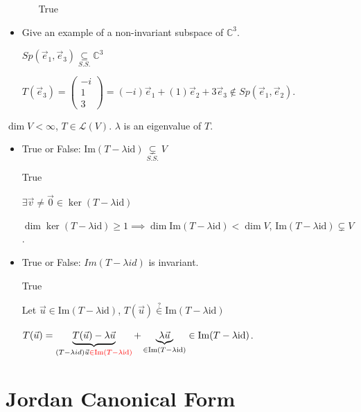 \documentclass[11pt,fleqn]{book} %
\begin{document}
\begin{example}
\begin{itemize}
\begin{itemize}
            True
        \end{itemize}

        \item Give an example of a non-invariant subspace of $\mathbb{C}^3$.

        $Sp(\vec{e}_1, \vec{e}_3) \underset{S.S.}{\subseteq} \mathbb{C}^3$

        $T(\vec{e}_3) = \begin{pmatrix} -i \\ 1 \\ 3 \end{pmatrix} = (-i)\vec{e}_1 + (1)\vec{e}_2 + 3\vec{e}_3 \not\in Sp(\vec{e}_1, \vec{e}_2)$.
    \end{itemize}
\end{example}

\begin{example}
    $\dim V < \infty$, $T \in \mathcal{L}(V)$. $\lambda$ is an eigenvalue of $T$.

    \begin{itemize}
        \item True or False: $\mathrm{Im}(T - \lambda \mathrm{id}) \underset{S.S.}{\subsetneq} V$

        True

        $\exists \vec{v} \neq \vec{0} \in \ker(T - \lambda \mathrm{id})$

        $\dim \ker (T - \lambda \mathrm{id}) \ge 1 \implies \dim \mathrm{Im}(T - \lambda \mathrm{id}) < \dim V$, $\mathrm{Im}(T - \lambda \mathrm{id}) \subsetneq V$.

        \item True or False: $Im(T - \lambda id)$ is invariant.

        True

        Let $\vec{u} \in \mathrm{Im}(T - \lambda \mathrm{id})$, $T(\vec{u}) \overset{?}{\in} \mathrm{Im}(T - \lambda \mathrm{id})$

        $T(\vec{u}) = \underbrace{T(\vec{u}) - \lambda\vec{u}}_{(T-\lambda id)\vec{u}\color{red}\in \mathrm{Im}(T-\lambda \mathrm{id})} + \underbrace{\lambda \vec{u}}_{\in \mathrm{Im}(T - \lambda \mathrm{id})} \in \mathrm{Im}(T - \lambda \mathrm{id})$.
    \end{itemize}
\end{example}

\chapter{Jordan Canonical Form}
\end{document}
